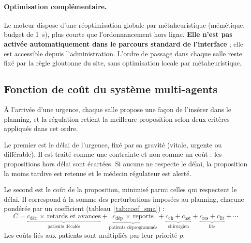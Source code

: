 \documentclass[11pt,a4paper]{article}
\begin{document}
\paragraph{Optimisation complémentaire.}
Le moteur dispose d'une réoptimisation globale par métaheuristique (mémétique, budget de 1~s), plus courte que l'ordonnancement hors ligne. \textbf{Elle n'est pas activée automatiquement dans le parcours standard de l'interface} ; elle est accessible depuis l'administration. L'ordre de passage dans chaque salle reste fixé par la règle gloutonne du site, sans optimisation locale par métaheuristique.

\subsection{Fonction de coût du système multi-agents}
\label{sec:cout_sma}

À l'arrivée d'une urgence, chaque salle propose une façon de l'insérer dans le planning, et la régulation retient la meilleure proposition selon deux critères appliqués dans cet ordre.

Le premier est le délai de l'urgence, fixé par sa gravité (vitale, urgente ou différable). Il est traité comme une contrainte et non comme un coût : les propositions hors délai sont écartées. Si aucune ne respecte le délai, la proposition la moins tardive est retenue et le médecin régulateur est alerté.

Le second est le coût de la proposition, minimisé parmi celles qui respectent le délai. Il correspond à la somme des perturbations imposées au planning, chacune pondérée par un coefficient (tableau~\ref{tab:coef_sma}) :
\begin{equation}
C = \underbrace{c_{\text{déc}}\,\times\,\text{retards et avances}}_{\text{patients décalés}}
+ \underbrace{c_{\text{dép}}\,\times\,\text{reports}}_{\text{patients déprogrammés}}
+ \underbrace{c_{\mathrm{ch}} + c_{\mathrm{ast}}}_{\text{chirurgien}}
+ \underbrace{c_{\mathrm{res}} + c_{\mathrm{lit}}}_{\text{lits}} + \cdots
\end{equation}
Les coûts liés aux patients sont multipliés par leur priorité $p$.
\end{document}
